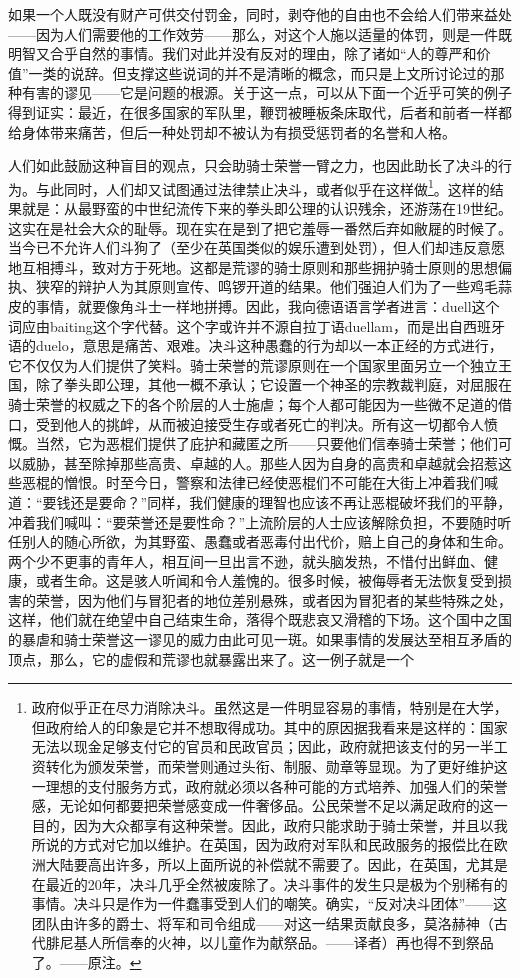 \documentclass[12pt,oneside]{book}
\begin{document}
如果一个人既没有财产可供交付罚金，同时，剥夺他的自由也不会给人们带来益处——因为人们需要他的工作效劳——那么，对这个人施以适量的体罚，则是一件既明智又合乎自然的事情。我们对此并没有反对的理由，除了诸如“人的尊严和价值”一类的说辞。但支撑这些说词的并不是清晰的概念，而只是上文所讨论过的那种有害的谬见——它是问题的根源。关于这一点，可以从下面一个近乎可笑的例子得到证实：最近，在很多国家的军队里，鞭罚被睡板条床取代，后者和前者一样都给身体带来痛苦，但后一种处罚却不被认为有损受惩罚者的名誉和人格。 

人们如此鼓励这种盲目的观点，只会助骑士荣誉一臂之力，也因此助长了决斗的行为。与此同时，人们却又试图通过法律禁止决斗，或者似乎在这样做\footnote{政府似乎正在尽力消除决斗。虽然这是一件明显容易的事情，特别是在大学，但政府给人的印象是它并不想取得成功。其中的原因据我看来是这样的：国家无法以现金足够支付它的官员和民政官员；因此，政府就把该支付的另一半工资转化为颁发荣誉，而荣誉则通过头衔、制服、勋章等显现。为了更好维护这一理想的支付服务方式，政府就必须以各种可能的方式培养、加强人们的荣誉感，无论如何都要把荣誉感变成一件奢侈品。公民荣誉不足以满足政府的这一目的，因为大众都享有这种荣誉。因此，政府只能求助于骑士荣誉，并且以我所说的方式对它加以维护。在英国，因为政府对军队和民政服务的报偿比在欧洲大陆要高出许多，所以上面所说的补偿就不需要了。因此，在英国，尤其是在最近的20年，决斗几乎全然被废除了。决斗事件的发生只是极为个别稀有的事情。决斗只是作为一件蠢事受到人们的嘲笑。确实，“反对决斗团体”——这团队由许多的爵士、将军和司令组成——对这一结果贡献良多，莫洛赫神（古代腓尼基人所信奉的火神，以儿童作为献祭品。——译者）再也得不到祭品了。——原注。}。这样的结果就是：从最野蛮的中世纪流传下来的拳头即公理的认识残余，还游荡在19世纪。这实在是社会大众的耻辱。现在实在是到了把它羞辱一番然后弃如敝屣的时候了。当今已不允许人们斗狗了（至少在英国类似的娱乐遭到处罚），但人们却违反意愿地互相搏斗，致对方于死地。这都是荒谬的骑士原则和那些拥护骑士原则的思想偏执、狭窄的辩护人为其原则宣传、鸣锣开道的结果。他们强迫人们为了一些鸡毛蒜皮的事情，就要像角斗士一样地拼搏。因此，我向德语语言学者进言：duell这个词应由baiting这个字代替。这个字或许并不源自拉丁语duellam，而是出自西班牙语的duelo，意思是痛苦、艰难。决斗这种愚蠢的行为却以一本正经的方式进行，它不仅仅为人们提供了笑料。骑士荣誉的荒谬原则在一个国家里面另立一个独立王国，除了拳头即公理，其他一概不承认；它设置一个神圣的宗教裁判庭，对屈服在骑士荣誉的权威之下的各个阶层的人士施虐；每个人都可能因为一些微不足道的借口，受到他人的挑衅，从而被迫接受生存或者死亡的判决。所有这一切都令人愤慨。当然，它为恶棍们提供了庇护和藏匿之所——只要他们信奉骑士荣誉；他们可以威胁，甚至除掉那些高贵、卓越的人。那些人因为自身的高贵和卓越就会招惹这些恶棍的憎恨。时至今日，警察和法律已经使恶棍们不可能在大街上冲着我们喊道：“要钱还是要命？”同样，我们健康的理智也应该不再让恶棍破坏我们的平静，冲着我们喊叫：“要荣誉还是要性命？”上流阶层的人士应该解除负担，不要随时听任别人的随心所欲，为其野蛮、愚蠢或者恶毒付出代价，赔上自己的身体和生命。两个少不更事的青年人，相互间一旦出言不逊，就头脑发热，不惜付出鲜血、健康，或者生命。这是骇人听闻和令人羞愧的。很多时候，被侮辱者无法恢复受到损害的荣誉，因为他们与冒犯者的地位差别悬殊，或者因为冒犯者的某些特殊之处，这样，他们就在绝望中自己结束生命，落得个既悲哀又滑稽的下场。这个国中之国的暴虐和骑士荣誉这一谬见的威力由此可见一斑。如果事情的发展达至相互矛盾的顶点，那么，它的虚假和荒谬也就暴露出来了。这一例子就是一个
\end{document}
